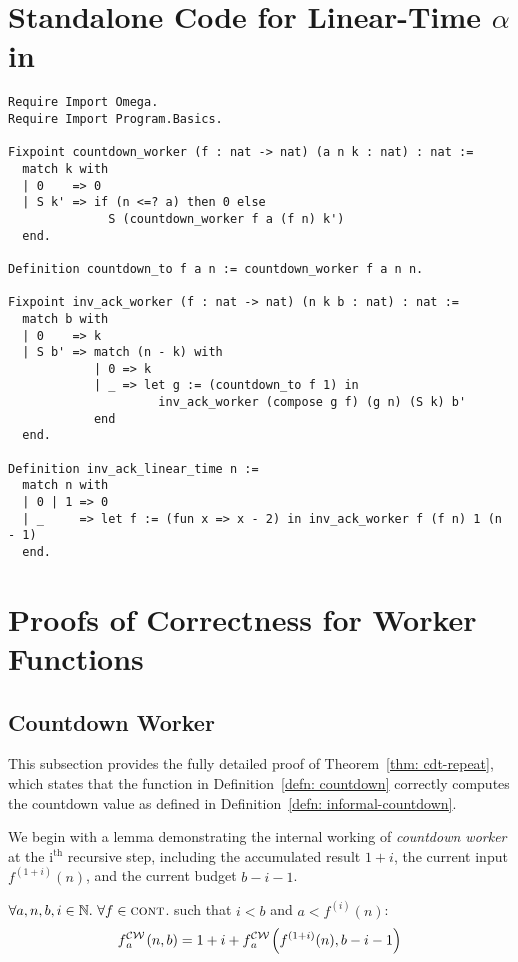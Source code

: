 \section{Standalone Code for Linear-Time $\alpha$ in }
\label{apx:standalone_nat}

\begin{lstlisting}
Require Import Omega.
Require Import Program.Basics.

Fixpoint countdown_worker (f : nat -> nat) (a n k : nat) : nat :=
  match k with
  | 0    => 0
  | S k' => if (n <=? a) then 0 else
              S (countdown_worker f a (f n) k')
  end.

Definition countdown_to f a n := countdown_worker f a n n.

Fixpoint inv_ack_worker (f : nat -> nat) (n k b : nat) : nat :=
  match b with
  | 0    => k
  | S b' => match (n - k) with
            | 0 => k
            | _ => let g := (countdown_to f 1) in
                     inv_ack_worker (compose g f) (g n) (S k) b'
            end
  end.

Definition inv_ack_linear_time n :=
  match n with
  | 0 | 1 => 0
  | _     => let f := (fun x => x - 2) in inv_ack_worker f (f n) 1 (n - 1)
  end.
\end{lstlisting}

\section{Proofs of Correctness for Worker Functions}
\label{apx:proof_correct_worker}

\subsection{Countdown Worker}
\label{apx:proof_correct_countdown_worker}
This subsection provides the fully detailed proof of Theorem~\ref{thm: cdt-repeat}, which states that the function in Definition~\ref{defn: countdown} correctly computes the countdown value as defined in Definition~\ref{defn: informal-countdown}.

We begin with a lemma demonstrating the internal working of \emph{countdown worker} at the $\text{i}^\text{th}$ recursive step, including the accumulated result $1+i$, the current input $f^{(1+i)}(n)$, and the current budget $b-i-1$.

\begin{lem} \label{lem: cdt-intermediate}
	$\forall a, n, b, i \in \mathbb{N}.~\forall f \in \text{\scshape{cont}}$. such that $i < b$ and $a < f^{(i)}(n)$:~
	\begin{equation}  \label{eq: cdt-intermediate}
	\cdw{f}{a}(n, b) = 1 + i + \cdw{f}{a}\left(f^{(1+i)}(n), b - i - 1\right)
	\end{equation}
\end{lem}

